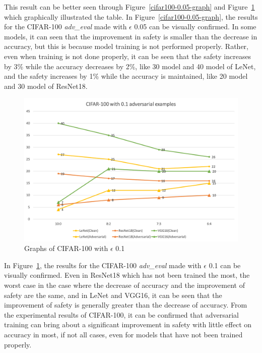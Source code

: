 \documentclass[journal,article,submit,moreauthors,pdftex]{Definitions/mdpi}
\begin{document}
This result can be better seen through Figure~\ref{cifar100-0.05-graph} and Figure~\ref{cifar100-0.1-graph} which graphically illustrated the table.
In Figure~\ref{cifar100-0.05-graph}, the results for the CIFAR-100 {\it adv\_eval} made with \begin{math}\epsilon\end{math} 0.05 can be visually confirmed.
In some models, it can seen that the improvement in safety is smaller than the decrease in accuracy, but this is because model training is not performed properly.
Rather, even when training is not done properly, it can be seen that the safety increases by 3\% while the accuracy decreases by 2\%, like 30 model and 40 model of LeNet,
and the safety increases by 1\% while the accuracy is maintained, like 20 model and 30 model of ResNet18.

\begin{figure}[H]
    \includegraphics[width=13 cm]{Definitions/graph-01cifar100.png}
    \caption{Graphs of CIFAR-100 with \begin{math}\epsilon\end{math} 0.1\label{cifar100-0.1-graph}}
\end{figure} 

In Figure~\ref{cifar100-0.1-graph}, the results for the CIFAR-100 {\it adv\_eval} made with \begin{math}\epsilon\end{math} 0.1 can be visually confirmed.
Even in ResNet18 which has not been trained the most, the worst case in the case where the decrease of accuracy and the improvement of safety are the same,
and in LeNet and VGG16, it can be seen that the improvement of safety is generally greater than the decrease of accuracy.
From the experimental results of CIFAR-100, it can be confirmed that adversarial training can bring about a significant improvement in safety with little effect on accuracy in most, if not all cases, even for models that have not been trained properly.
\end{document}
